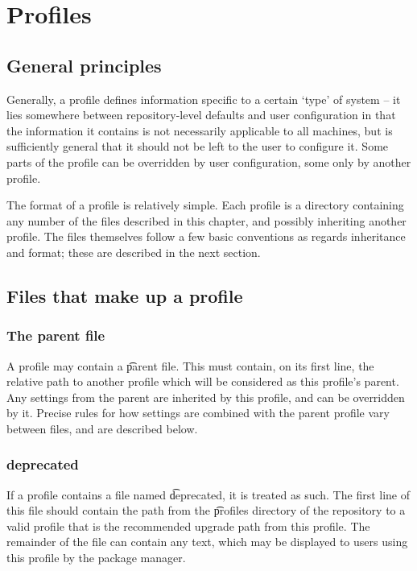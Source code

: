 \chapter{Profiles}
\label{profiles}

\section{General principles}
Generally, a profile defines information specific to a certain `type' of system -- it lies somewhere
between repository-level defaults and user configuration in that the information it contains is not
necessarily applicable to all machines, but is sufficiently general that it should not be left to
the user to configure it. Some parts of the profile can be overridden by user configuration, some
only by another profile.

The format of a profile is relatively simple. Each profile is a directory containing any number of
the files described in this chapter, and possibly inheriting another profile. The files themselves
follow a few basic conventions as regards inheritance and format; these are described in the next
section.

\section{Files that make up a profile}
\subsection{The parent file}
A profile may contain a \t{parent} file. This must contain, on its first line, the relative path to
another profile which will be considered as this profile's parent. Any settings from the parent are
inherited by this profile, and can be overridden by it. Precise rules for how settings are combined
with the parent profile vary between files, and are described below.

\subsection{deprecated}
If a profile contains a file named \t{deprecated}, it is treated as such. The first line of this
file should contain the path from the \t{profiles} directory of the repository to a valid profile
that is the recommended upgrade path from this profile. The remainder of the file can contain any
text, which may be displayed to users using this profile by the package manager.

